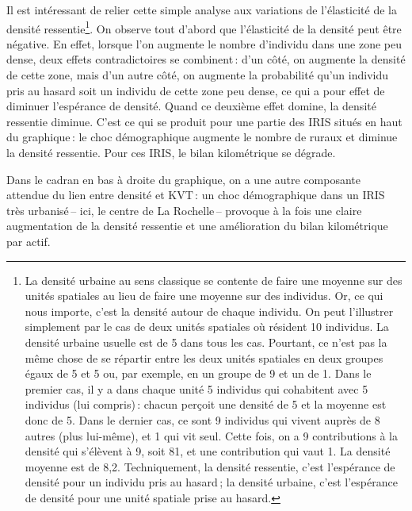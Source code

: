 \documentclass[
  9pt,
  a4paper,
  DIV=11]{scrreprt}
\begin{document}
Il est intéressant de relier cette simple analyse aux variations de
l'élasticité de la densité ressentie\footnote{La densité urbaine au sens
  classique se contente de faire une moyenne sur des unités spatiales au
  lieu de faire une moyenne sur des individus. Or, ce qui nous importe,
  c'est la densité autour de chaque individu. On peut l'illustrer
  simplement par le cas de deux unités spatiales où résident 10
  individus. La densité urbaine usuelle est de 5 dans tous les cas.
  Pourtant, ce n'est pas la même chose de se répartir entre les deux
  unités spatiales en deux groupes égaux de 5 et 5 ou, par exemple, en
  un groupe de 9 et un de 1. Dans le premier cas, il y a dans chaque
  unité 5 individus qui cohabitent avec 5 individus (lui compris)\,:
  chacun perçoit une densité de 5 et la moyenne est donc de 5. Dans le
  dernier cas, ce sont 9 individus qui vivent auprès de 8 autres (plus
  lui-même), et 1 qui vit seul. Cette fois, on a 9 contributions à la
  densité qui s'élèvent à 9, soit 81, et une contribution qui vaut 1. La
  densité moyenne est de 8,2. Techniquement, la densité ressentie, c'est
  l'espérance de densité pour un individu pris au hasard\,; la densité
  urbaine, c'est l'espérance de densité pour une unité spatiale prise au
  hasard.}. On observe tout d'abord que l'élasticité de la densité peut
être négative. En effet, lorsque l'on augmente le nombre d'individu dans
une zone peu dense, deux effets contradictoires se combinent\,: d'un
côté, on augmente la densité de cette zone, mais d'un autre côté, on
augmente la probabilité qu'un individu pris au hasard soit un individu
de cette zone peu dense, ce qui a pour effet de diminuer l'espérance de
densité. Quand ce deuxième effet domine, la densité ressentie diminue.
C'est ce qui se produit pour une partie des IRIS situés en haut du
graphique\,: le choc démographique augmente le nombre de ruraux et
diminue la densité ressentie. Pour ces IRIS, le bilan kilométrique se
dégrade.

Dans le cadran en bas à droite du graphique, on a une autre composante
attendue du lien entre densité et KVT\,: un choc démographique dans un
IRIS très urbanisé\,-- ici, le centre de La Rochelle\,-- provoque à la
fois une claire augmentation de la densité ressentie et une amélioration
du bilan kilométrique par actif.
\end{document}
